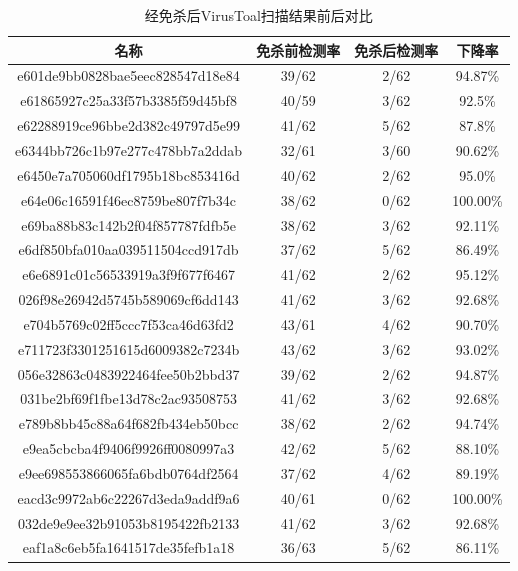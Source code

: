 \begin{table}[htbp]
	\centering
	\caption{经免杀后VirusToal扫描结果前后对比}
	\label{tab:5.13}
	\begin{tabular*}{0.9\textwidth}{@{\extracolsep{\fill}}cccc}
		\toprule
		名称 & 免杀前检测率 & 免杀后检测率 & 下降率 \\
		\midrule
		e601de9bb0828bae5eec828547d18e84 & 39/62 & 2/62 & 94.87\% \\
		e61865927c25a33f57b3385f59d45bf8 & 40/59 & 3/62 & 92.5\% \\
		e62288919ce96bbe2d382c49797d5e99 & 41/62 & 5/62 & 87.8\% \\
		e6344bb726c1b97e277c478bb7a2ddab & 32/61 & 3/60 & 90.62\% \\
		e6450e7a705060df1795b18bc853416d & 40/62 & 2/62 & 95.0\% \\
		e64e06c16591f46ec8759be807f7b34c & 38/62 & 0/62 & 100.00\% \\
		e69ba88b83c142b2f04f857787fdfb5e & 38/62 & 3/62 & 92.11\% \\
		e6df850bfa010aa039511504ccd917db & 37/62 & 5/62 & 86.49\% \\
		e6e6891c01c56533919a3f9f677f6467 & 41/62 & 2/62 & 95.12\% \\
		026f98e26942d5745b589069cf6dd143 & 41/62 & 3/62 & 92.68\% \\
		e704b5769c02ff5ccc7f53ca46d63fd2 & 43/61 & 4/62 & 90.70\% \\
		e711723f3301251615d6009382c7234b & 43/62 & 3/62 & 93.02\% \\
		056e32863c0483922464fee50b2bbd37 & 39/62 & 2/62 & 94.87\% \\
		031be2bf69f1fbe13d78c2ac93508753 & 41/62 & 3/62 & 92.68\% \\
		e789b8bb45c88a64f682fb434eb50bcc & 38/62 & 2/62 & 94.74\% \\
		e9ea5cbcba4f9406f9926ff0080997a3 & 42/62 & 5/62 & 88.10\% \\
		e9ee698553866065fa6bdb0764df2564 & 37/62 & 4/62 & 89.19\% \\
		eacd3c9972ab6c22267d3eda9addf9a6 & 40/61 & 0/62 & 100.00\% \\
		032de9e9ee32b91053b8195422fb2133 & 41/62 & 3/62 & 92.68\% \\
		eaf1a8c6eb5fa1641517de35fefb1a18 & 36/63 & 5/62 & 86.11\% \\
		\bottomrule
	\end{tabular*}
\end{table}

